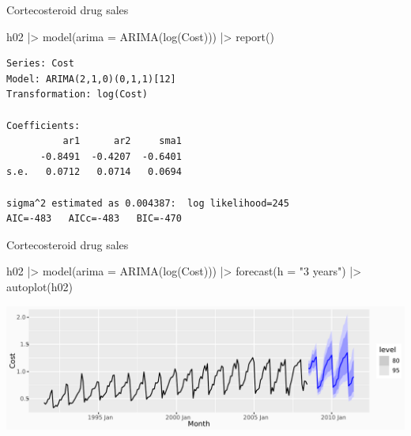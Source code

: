 \documentclass[
  14pt,
  ignorenonframetext,
  aspectratio=169,
]{beamer}
\newenvironment{Shaded}{\begin{snugshade}}{\end{snugshade}}
\newcommand{\AttributeTok}[1]{\textcolor[rgb]{0.77,0.63,0.00}{#1}}
\newcommand{\FunctionTok}[1]{\textcolor[rgb]{0.00,0.00,0.00}{#1}}
\newcommand{\NormalTok}[1]{\textcolor[rgb]{0.00,0.00,0.00}{#1}}
\newcommand{\SpecialCharTok}[1]{\textcolor[rgb]{0.00,0.00,0.00}{#1}}
\newcommand{\StringTok}[1]{\textcolor[rgb]{0.31,0.60,0.02}{#1}}
\renewenvironment{Shaded}{\vspace*{0.15cm}\color{black}\fontsize{10}{10}\sf\begin{snugshade}\color{black}}{\end{snugshade}}
\begin{document}
\begin{frame}[fragile]{Cortecosteroid drug sales}
\protect\hypertarget{cortecosteroid-drug-sales-5}{}
\fontsize{11}{12}\sf

\begin{Shaded}
\begin{Highlighting}[]
\NormalTok{h02 }\SpecialCharTok{|\textgreater{}}
  \FunctionTok{model}\NormalTok{(}\AttributeTok{arima =} \FunctionTok{ARIMA}\NormalTok{(}\FunctionTok{log}\NormalTok{(Cost))) }\SpecialCharTok{|\textgreater{}}
  \FunctionTok{report}\NormalTok{()}
\end{Highlighting}
\end{Shaded}

\begin{verbatim}
Series: Cost 
Model: ARIMA(2,1,0)(0,1,1)[12] 
Transformation: log(Cost) 

Coefficients:
          ar1      ar2     sma1
      -0.8491  -0.4207  -0.6401
s.e.   0.0712   0.0714   0.0694

sigma^2 estimated as 0.004387:  log likelihood=245
AIC=-483   AICc=-483   BIC=-470
\end{verbatim}
\end{frame}

\begin{frame}[fragile]{Cortecosteroid drug sales}
\protect\hypertarget{cortecosteroid-drug-sales-6}{}
\fontsize{11}{13}\sf

\begin{Shaded}
\begin{Highlighting}[]
\NormalTok{h02 }\SpecialCharTok{|\textgreater{}}
  \FunctionTok{model}\NormalTok{(}\AttributeTok{arima =} \FunctionTok{ARIMA}\NormalTok{(}\FunctionTok{log}\NormalTok{(Cost))) }\SpecialCharTok{|\textgreater{}}
  \FunctionTok{forecast}\NormalTok{(}\AttributeTok{h =} \StringTok{"3 years"}\NormalTok{) }\SpecialCharTok{|\textgreater{}}
  \FunctionTok{autoplot}\NormalTok{(h02)}
\end{Highlighting}
\end{Shaded}

\includegraphics{04_arima_files/figure-beamer/h02fcst-1.pdf}

\vspace*{5cm}
\end{frame}
\end{document}
